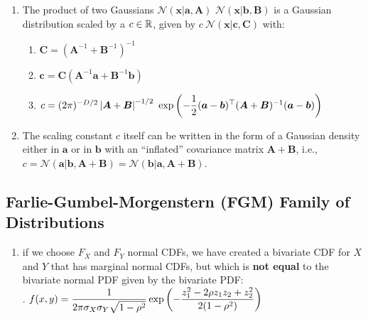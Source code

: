 \begin{enumerate}
    \item The product of two Gaussians $\mathcal{N}(\bm{x} | \bm{a}, \bm{A})$ $\mathcal{N} (\bm{x} | \bm{b}, \bm{B})$ is a Gaussian distribution scaled by a $c \in \mathbb{R}$, given by $c\ \mathcal{N}( \bm{x} | \bm{c}, \bm{C})$ with:
    \hfill \cite{mfml/book/mml/Deisenroth-Faisal-Ong}
    \begin{enumerate}
        \item $ \bm{C} = (\bm{A}^{-1} + \bm{B}^{-1})^{-1} $
        \hfill \cite{mfml/book/mml/Deisenroth-Faisal-Ong}

        \item $ \bm{c} = \bm{C}(\bm{A}^{-1}\bm{a} + \bm{B}^{-1}\bm{b})  $
        \hfill \cite{mfml/book/mml/Deisenroth-Faisal-Ong}

        \item $ c = (2\pi)^{- D/2} \left| \bm{A} + \bm{B} \right|^{- 1/2}\  \exp  \left(- \dfrac{1 }{2} (\bm{a} - \bm{b})^\top(\bm{A} + \bm{B})^{-1}(\bm{a} - \bm{b})\right) $
        \hfill \cite{mfml/book/mml/Deisenroth-Faisal-Ong}
    \end{enumerate}

    \item The scaling constant $c$ itself can be written in the form of a Gaussian density either in $\bm{a}$ or in $\bm{b}$ with an “inflated” covariance matrix $\bm{A} + \bm{B}$, i.e., $c = \mathcal{N} (\bm{a} | \bm{b}, \bm{A} + \bm{B}) = \mathcal{N} (\bm{b} | \bm{a}, \bm{A} + \bm{B})$.
    \hfill \cite{mfml/book/mml/Deisenroth-Faisal-Ong}

    
\end{enumerate}




















\subsection{Farlie-Gumbel-Morgenstern (FGM) Family of Distributions}

\begin{enumerate}
    \item  if we choose $F_X$ and $F_Y$ normal CDFs, we have created a bivariate CDF for $X$ and $Y$ that has marginal normal CDFs, but which is \textbf{not equal} to the bivariate normal PDF given by the bivariate PDF:
    \hfill \cite{statistics/book/Statistics-for-Data-Scientists/Maurits-Kaptein}
    \\[0.3cm]
    .\hfill
    $
        f (x, y)
        = \dfrac{1}{ 2\pi\sigma_X \sigma_Y \sqrt{1 - \rho^2} }
        \exp \left(
            - \dfrac{z^2_1 - 2\rho z_1z_2 + z^2_2 }{2(1 - \rho^2)}
        \right)
    $
    \hfill \cite{statistics/book/Statistics-for-Data-Scientists/Maurits-Kaptein}
\end{enumerate}





